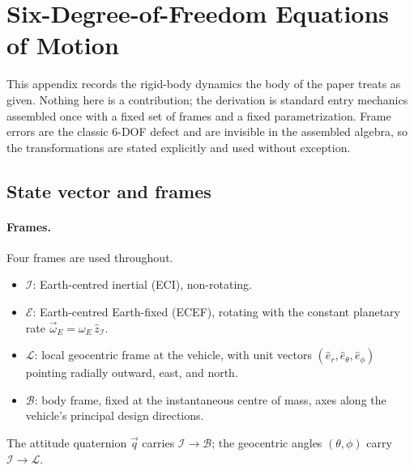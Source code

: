 %
%

\section{Six-Degree-of-Freedom Equations of Motion}
\label{apx:eom}

This appendix records the rigid-body dynamics the body of the paper
treats as given. Nothing here is a contribution; the derivation is
standard entry mechanics assembled once with a fixed set of 
frames and a fixed parametrization. Frame errors are the classic $6$-DOF defect 
and are invisible in the assembled algebra, so the transformations are stated 
explicitly and used without exception.

\subsection{State vector and frames}
\label{sub:apx_state_and_frames}

\paragraph{Frames.} Four frames are used throughout.
\begin{itemize}
  \item $\mathcal I$: Earth-centred inertial (ECI), non-rotating.
  \item $\mathcal E$: Earth-centred Earth-fixed (ECEF), rotating with the
        constant planetary rate $\vec\omega_E = \omega_E\,\hat z_{\mathcal I}$.
  \item $\mathcal L$: local geocentric frame at the vehicle, with unit
        vectors $(\hat e_r,\hat e_\theta,\hat e_\phi)$ pointing radially
        outward, east, and north.
  \item $\mathcal B$: body frame, fixed at the instantaneous centre of
        mass, axes along the vehicle's principal design directions.
\end{itemize}
The attitude quaternion $\vec q$ carries $\mathcal I \to \mathcal B$; the
geocentric angles $(\theta,\phi)$ carry $\mathcal I \to \mathcal L$.

